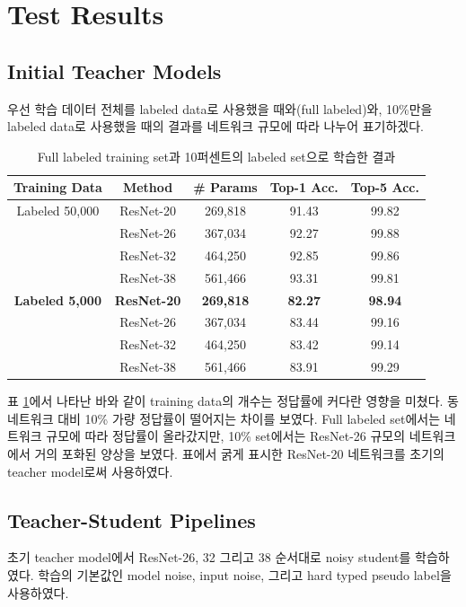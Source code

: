 \section{Test Results}
\subsection{Initial Teacher Models}
우선 학습 데이터 전체를 labeled data로 사용했을 때와(full labeled)와, 10\%만을 labeled data로 사용했을 때의 결과를 네트워크 규모에 따라 나누어 표기하겠다.

\begin{table}[!h]
  \center
  \begin{tabular}{|c|c|c|cc|}
\hline
Training Data & Method & \# Params & Top-1 Acc. & Top-5 Acc. \\ \hline
Labeled 50,000 & ResNet-20 & 269,818 & 91.43 & 99.82 \\
               & ResNet-26 & 367,034 & 92.27 & 99.88 \\
               & ResNet-32 & 464,250 & 92.85 & 99.86 \\
               & ResNet-38 & 561,466 & 93.31 & 99.81 \\ \hline
\textbf{Labeled 5,000}  & \textbf{ResNet-20} & \textbf{269,818} & \textbf{82.27}
& \textbf{98.94} \\
               & ResNet-26 & 367,034 & 83.44 & 99.16 \\
               & ResNet-32 & 464,250 & 83.42 & 99.14 \\
               & ResNet-38 & 561,466 & 83.91 & 99.29 \\ \hline
  \end{tabular}
  \caption{Full labeled training set과 10퍼센트의 labeled set으로 학습한 결과}
  \label{fulland10}
\end{table}

표 \ref{fulland10}에서 나타난 바와 같이 training data의 개수는 정답률에 커다란 영향을 미쳤다. 동 네트워크 대비 10\% 가량 정답률이 떨어지는 차이를 보였다. Full labeled set에서는 네트워크 규모에 따라 정답률이 올라갔지만, 10\% set에서는 ResNet-26 규모의 네트워크에서 거의 포화된 양상을 보였다. 표에서 굵게 표시한 ResNet-20 네트워크를 초기의 teacher model로써 사용하였다.

\subsection{Teacher-Student Pipelines}
초기 teacher model에서 ResNet-26, 32 그리고 38 순서대로 noisy student를 학습하였다. 학습의 기본값인 model noise, input noise, 그리고 hard typed pseudo label을 사용하였다.

